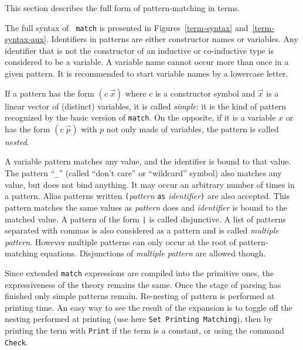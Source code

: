 
\label{Mult-match-full}

This section describes the full form of pattern-matching in {\Coq} terms.

\label{implementation} The full syntax of {\tt
match} is presented in Figures~\ref{term-syntax}
and~\ref{term-syntax-aux}.  Identifiers in patterns are either
constructor names or variables. Any identifier that is not the
constructor of an inductive or co-inductive type is considered to be a
variable. A variable name cannot occur more than once in a given
pattern. It is recommended to start variable names by a lowercase
letter.

If a pattern has the form $(c~\vec{x})$ where $c$ is a constructor
symbol and $\vec{x}$ is a linear vector of (distinct) variables, it is
called {\em simple}: it is the kind of pattern recognized by the basic
version of {\tt match}. On the opposite, if it is a variable $x$ or
has the form $(c~\vec{p})$ with $p$ not only made of variables, the
pattern is called {\em nested}.

A variable pattern matches any value, and the identifier is bound to
that value. The pattern ``\texttt{\_}'' (called ``don't care'' or
``wildcard'' symbol) also matches any value, but does not bind
anything. It may occur an arbitrary number of times in a
pattern. Alias patterns written \texttt{(}{\sl pattern} \texttt{as}
{\sl identifier}\texttt{)} are also accepted. This pattern matches the
same values as {\sl pattern} does and {\sl identifier} is bound to the
matched value.
A pattern of the form {\pattern}{\tt |}{\pattern} is called
disjunctive. A list of patterns separated with commas is also
considered as a pattern and is called {\em multiple pattern}. However
multiple patterns can only occur at the root of pattern-matching
equations. Disjunctions of {\em multiple pattern} are allowed though.

Since extended {\tt match} expressions are compiled into the primitive
ones, the expressiveness of the theory remains the same. Once the
stage of parsing has finished only simple patterns remain.  Re-nesting
of pattern is performed at printing time. An easy way to see the
result of the expansion is to toggle off the nesting performed at
printing (use here {\tt Set Printing Matching}), then by printing the term
with \texttt{Print} if the term is a constant, or using the command
\texttt{Check}.

